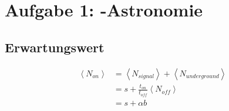 \section*{Aufgabe 1: \gamma-Astronomie}
\label{sec:Aufgabe1}
\subsection*{Erwartungswert}
\label{sub:Erwartungswert}
\begin{align}
    \left<N_{on}\right> &=\left<N_{signal}\right>+\left<N_{underground}\right>\nonumber\\
                        &=s + \frac{t_{on}}{t_{off}} \left<N_{off}\right>\nonumber\\
                        &=s+\alpha b
\end{align}